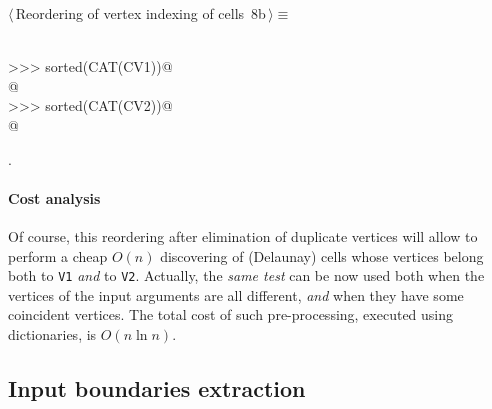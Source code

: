 \documentclass[11pt,oneside]{article}	%
\begin{document}
\begin{flushleft} \small \label{scrap11}
\protect{}$\langle\,$Reordering of vertex indexing of cells\nobreak\ {\footnotesize 8b}$\,\rangle\equiv$
\vspace{-1ex}
\begin{list}{}{} \item
\mbox{}\verb@@\\
\mbox{}\verb@>>> sorted(CAT(CV1))@\\
\mbox{}\verb@[0, 1, 1, 2, 3, 4, 5, 5]@\\
\mbox{}\verb@>>> sorted(CAT(CV2))@\\
\mbox{}\verb@[3, 4, 5, 6, 7, 7, 8, 8, 9, 10, 11]@\\
\mbox{}\verb@@{\NWsep}
\end{list}
\vspace{-1ex}
\footnotesize\addtolength{\baselineskip}{-1ex}
\begin{list}{}{\setlength{\itemsep}{-\parsep}\setlength{\itemindent}{-\leftmargin}}
\item {\NWtxtMacroNoRef}.
\end{list}
\end{flushleft}
\paragraph{Cost analysis} 
Of course, this reordering after elimination of duplicate vertices will allow to perform a cheap $O(n)$ discovering of (Delaunay) cells whose vertices belong both to \texttt{V1} \emph{and} to \texttt{V2}. 
Actually, the \emph{same test} can be now used both when the vertices of the input arguments are all different, \emph{and} when they have some coincident vertices.
The total cost of such pre-processing, executed using dictionaries, is $O(n\ln n)$.

\subsection{Input boundaries extraction}
\end{document}
